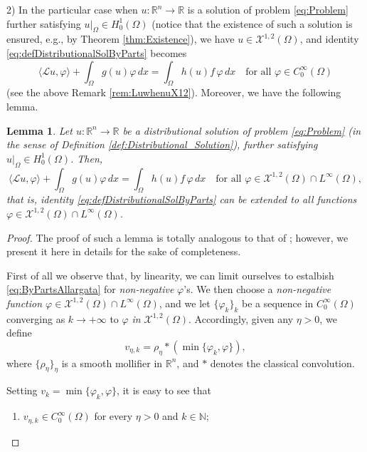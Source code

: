 \documentclass[11pt,a4paper]{amsart}
\theoremstyle{definition}
\theoremstyle{plain}
\newtheorem{lemma}[definition]{Lemma}
\numberwithin{equation}{section}
\begin{document}
{ 2)\,\,In the particular case when $u:\mathbb{R}^n\to\mathbb{R}$ is a solution of problem \eqref{eq:Problem} further satisfying $u|_\Omega\in H_0^1(\Omega)$ (notice that the existence of such a solution is ensured, e.g., by Theorem \ref{thm:Existence}), we have $u\in \mathcal{X}^{1,2}(\Omega)$, and identity \eqref{eq:defDistributionalSolByParts} becomes
$$\langle \mathcal{L}u,\varphi\rangle +\int_{\Omega}g(u)\varphi\,dx
= \int_{\Omega}h(u)f\,\varphi\,dx\quad\text{for all $\varphi\in C_0^\infty(\Omega)$}$$ 
 (see the above Remark \ref{rem:LuwhenuX12}). Moreover, we have the following lemma.
 \begin{lemma} \label{lem:LargerTest}
 	Let $u:\mathbb{R}^n\to\mathbb{R}$ be a distributional solution of problem \eqref{eq:Problem} 
 	(in the sense of De\-fi\-nition \ref{def:Distributional_Solution}), further satisfying $u|_\Omega\in H_0^1(\Omega)$. Then,
 	\begin{equation} \label{eq:ByPartsAllargata}
 		\langle \mathcal{L}u,\varphi\rangle +\int_{\Omega}g(u)\varphi\,dx
= \int_{\Omega}h(u)f\,\varphi\,dx\quad\text{for all $\varphi\in \mathcal{X}^{1,2}(\Omega)\cap L^\infty(\Omega)$},
 	\end{equation}
 	that is, identity \eqref{eq:defDistributionalSolByParts} can be extended to all functions $\varphi\in \mathcal{X}^{1,2}(\Omega)\cap L^\infty(\Omega)$.
 \end{lemma}
\begin{proof}
 The proof of such a lemma is totally analogous to that of
 \cite[Theorem 6.1]{Oliva}; however, we present it here in details for the sake of completeness. 
 \medskip
 
 First of all we observe that, by linearity, we can limit ourselves to estalbish
 \eqref{eq:ByPartsAllargata} for \emph{non-ne\-gative} $\varphi$'s. We then
 choose a \emph{non-negative function $\varphi\in \mathcal{X}^{1,2}(\Omega)\cap L^\infty(\Omega)$}, and we let $\{\varphi_k\}_k$ be a sequence 
 in $C_0^\infty(\Omega)$ converging as $k\to+\infty$ to $\varphi$
 \emph{in $\mathcal{X}^{1,2}(\Omega)$}.
 Accordingly, given any $\eta > 0$, we define
 $$v_{\eta,k} = \rho_\eta*(\min\{\varphi_k,\varphi\}),$$
 where $\{\rho_\eta\}_\eta$ is a smooth mollifier in $\mathbb{R}^n$, and $*$ denotes the classical convolution.
 
 Setting $v_k = \min\{\varphi_k,\varphi\}$, it is easy to see that
 \begin{enumerate}
   \item $v_{\eta,k}\in C_0^\infty(\Omega)$ for every $\eta > 0$ and $k\in\mathbb{N}$;
   \vspace{0.1cm}
   

\end{enumerate}
\end{proof}}
\end{document}
